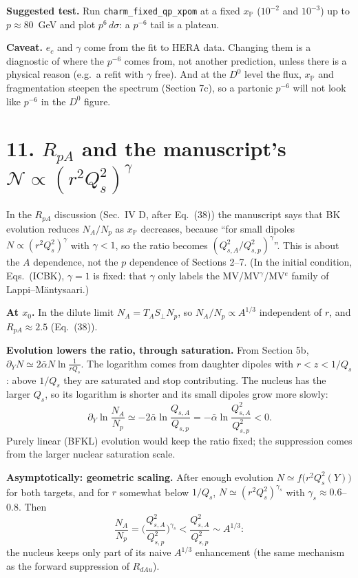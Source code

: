 \documentclass[12pt]{article}
\begin{document}
\textbf{Suggested test.} Run \texttt{charm\_fixed\_qp\_xpom} at a fixed $x_{\mathbb P}$ ($10^{-2}$ and
$10^{-3}$) up to $p\approx80$~GeV and plot $p^6\,d\sigma$: a $p^{-6}$ tail is a plateau.

\textbf{Caveat.} $e_c$ and $\gamma$ come from the fit to HERA data. Changing them is a diagnostic of where
the $p^{-6}$ comes from, not another prediction, unless there is a physical reason (e.g.\ a refit with
$\gamma$ free). And at the $D^0$ level the flux, $x_{\mathbb P}$ and fragmentation steepen the spectrum
(Section 7c), so a partonic $p^{-6}$ will not look like $p^{-6}$ in the $D^0$ figure.

\section*{11. $R_{pA}$ and the manuscript's $\mathcal N\propto(r^2Q_s^2)^\gamma$}

In the $R_{pA}$ discussion (Sec.~IV D, after Eq.~(38)) the manuscript says that BK evolution reduces
$N_A/N_p$ as $x_{\mathbb P}$ decreases, because ``for small dipoles $N\propto(r^2Q_s^2)^\gamma$ with
$\gamma<1$, so the ratio becomes $(Q_{s,A}^2/Q_{s,p}^2)^\gamma$''. This is about the $A$ dependence, not the
$p$ dependence of Sections 2--7. (In the initial condition, Eqs.~(ICBK), $\gamma=1$ is fixed: that
$\gamma$ only labels the MV/MV$^\gamma$/MV$^e$ family of Lappi--M\"antysaari.)

\textbf{At $x_0$.} In the dilute limit $N_A=T_AS_\perp N_p$, so $N_A/N_p\propto A^{1/3}$ independent of $r$,
and $R_{pA}\approx2.5$ (Eq.~(38)).

\textbf{Evolution lowers the ratio, through saturation.} From Section 5b,
$\partial_YN\simeq2\bar\alpha N\ln\frac1{rQ_s}$. The logarithm comes from daughter dipoles with
$r<z<1/Q_s$: above $1/Q_s$ they are saturated and stop contributing. The nucleus has the larger $Q_s$, so
its logarithm is shorter and its small dipoles grow more slowly:
\[
  \partial_Y\ln\frac{N_A}{N_p}\simeq-2\bar\alpha\ln\frac{Q_{s,A}}{Q_{s,p}}=-\bar\alpha\ln\frac{Q_{s,A}^2}{Q_{s,p}^2}<0.
\]
Purely linear (BFKL) evolution would keep the ratio fixed; the suppression comes from the larger
nuclear saturation scale.

\textbf{Asymptotically: geometric scaling.} After enough evolution $N\simeq f\big(r^2Q_s^2(Y)\big)$ for both
targets, and for $r$ somewhat below $1/Q_s$, $N\simeq(r^2Q_s^2)^{\gamma_s}$ with $\gamma_s\approx0.6$--$0.8$.
Then
\[
  \frac{N_A}{N_p}=\Big(\frac{Q_{s,A}^2}{Q_{s,p}^2}\Big)^{\gamma_s}<\frac{Q_{s,A}^2}{Q_{s,p}^2}\sim A^{1/3}:
\]
the nucleus keeps only part of its naive $A^{1/3}$ enhancement (the same mechanism as the forward
suppression of $R_{dAu}$).
\end{document}
